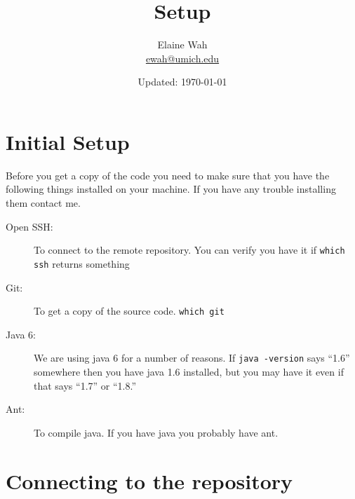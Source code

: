\documentclass[11pt]{article}
\title{Setup}
\author{
  Elaine Wah \\
  \href{mailto:ewah@umich.edu}{ewah@umich.edu}
}
\date{Updated: \today}
\begin{document}
\maketitle

\section{Initial Setup}

Before you get a copy of the code you need to make sure that you have the
following things installed on your machine. If you have any trouble installing
them contact me.

\begin{description}
\item[Open SSH:] To connect to the remote repository. You can verify you have it
  if \texttt{which ssh} returns something
\item[Git:] To get a copy of the source code. \texttt{which git}
\item[Java 6:] We are using java 6 for a number of reasons. If \texttt{java
  -version} says ``1.6'' somewhere then you have java 1.6 installed, but you may
  have it even if that says ``1.7'' or ``1.8.''
\item[Ant:] To compile java. If you have java you probably have ant.
\end{description}

\section{Connecting to the repository}
\end{document}
